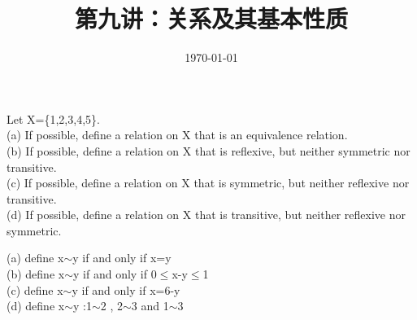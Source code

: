 \documentclass[11pt, a4paper, UTF8]{ctexart}
\title{第九讲：关系及其基本性质}
\date{\today}     %
\begin{document}
\maketitle
\noplagiarism %
\beginthishw  %


\begin{problem}[UD:10.2]
Let X=\{1,2,3,4,5\}.\\
(a) If possible, define a relation on X that is an equivalence relation.\\
(b) If possible, define a relation on X that is reflexive, but neither symmetric nor transitive.\\
(c) If possible, define a relation on X that is symmetric, but neither reflexive nor transitive.\\
(d) If possible, define a relation on X that is transitive, but neither reflexive nor symmetric.\\
\end{problem}
\begin{solution}
(a) define x$\sim$y if and only if x=y\\
(b) define x$\sim$y if and only if 0$\le$x-y$\le$1\\
(c) define x$\sim$y if and only if x=6-y\\
(d) define x$\sim$y :1$\sim$2 , 2$\sim$3 and 1$\sim$3

\end{solution}
\end{document}
